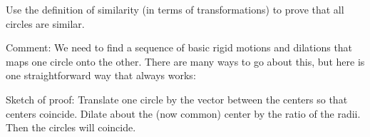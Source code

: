 \documentclass[nooutcomes]{ximera}
\begin{document}
%

%

\begin{question}
Use the definition of similarity (in terms of transformations) to prove that all circles are similar.  
\begin{freeResponse}
\end{freeResponse}
\begin{hint}
Comment: We need to find a sequence of basic rigid motions and dilations that maps one circle onto the other.  There are many ways to go about this, but here is one straightforward way that always works: 

Sketch of proof:  Translate one circle by the vector between the centers so that centers coincide.  Dilate about the (now common) center by the ratio of the radii.  Then the circles will coincide.  
\end{hint}
\end{question}
\end{document}
